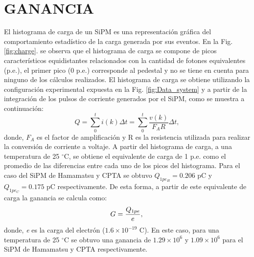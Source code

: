 \section{GANANCIA}
El histograma de carga de un SiPM es una representación gráfica del comportamiento estadístico de la carga generada por sus eventos. En la Fig. \ref{fig:charge}. se observa que el histograma de carga se compone de picos característicos equidistantes relacionados con la cantidad de fotones equivalentes (p.e.), el primer pico (0 p.e.) corresponde al pedestal y no se tiene en cuenta para ninguno de los cálculos realizados. El histograma de  carga se obtiene utilizando la configuración experimental expuesta en la Fig. \ref{fig:Data_system} y a partir de la integración de los pulsos de corriente generados por el SiPM, como se muestra a continuación:
\begin{equation}
Q = \displaystyle\sum_{0}^{t} i(k) \Delta  t = \displaystyle\sum_{0}^{t} \frac{v(k)}{F_A R} \Delta  t, 
\end{equation}
donde, $F_A$ es el factor de amplificación y R es la resistencia utilizada para realizar la conversión de corriente a voltaje. A partir del histograma de carga, a una temperatura de 25 $^\circ$C, se obtiene el equivalente de carga de 1 p.e. como el promedio de las diferencias entre cada uno de los picos del histograma. Para el caso del SiPM de Hamamatsu y CPTA se obtuvo $Q_{1pe_H}=0.206 $ pC y $Q_{1pe_C}=0.175 $ pC respectivamente. De esta forma, a partir de este equivalente de carga la ganancia se calcula como:
\begin{equation}
G = \frac{Q_{1pe}}{e},\\
\end{equation}
donde, \textit{e} es la carga del electrón ($1.6\times10^{-19}$ C). En este caso, para una temperatura de 25 $^\circ$C se obtuvo una ganancia de $1.29\times10^6$ y $1.09\times10^6$ para el SiPM de Hamamatsu y CPTA respectivamente.
